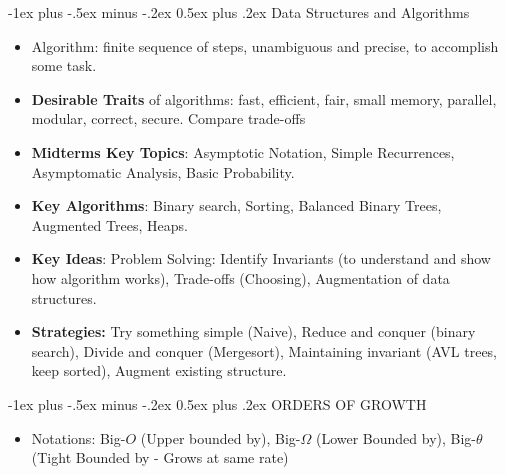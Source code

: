 \documentclass[10pt, landscape]{article}
\makeatletter
\renewcommand{\section}{\@startsection{section}{1}{0mm}%
                                {-1ex plus -.5ex minus -.2ex}%
                                {0.5ex plus .2ex}%
                                {\normalfont\large\bfseries}}
\makeatother
\begin{document}
\raggedright
\footnotesize
\begin{multicols}{4}



\setlength{\columnseprule}{0.25pt}
\setlength{\premulticols}{1pt}
\setlength{\postmulticols}{1pt}
\setlength{\multicolsep}{1pt}
\setlength{\columnsep}{2pt}




 \begin{center}
  \end{center}
  
\section{Data Structures and Algorithms}
 \begin{itemize}
	\item Algorithm: finite sequence of steps, unambiguous and precise, to accomplish some task.
	\item \textbf{Desirable Traits} of algorithms: fast, efficient, fair, small memory, parallel, modular, correct, secure. Compare trade-offs
	\item \textbf{Midterms Key Topics}: Asymptotic Notation, Simple Recurrences, Asymptomatic Analysis, Basic Probability. 
	\item \textbf{Key Algorithms}: Binary search, Sorting, Balanced Binary Trees, Augmented Trees, Heaps. 
	\item \textbf{Key Ideas}: Problem Solving: Identify Invariants (to understand and show how algorithm works), Trade-offs (Choosing), Augmentation of data structures. 
	\item \textbf{Strategies:} Try something simple (Naive), Reduce and conquer (binary search), Divide and conquer (Mergesort), Maintaining invariant (AVL trees, keep sorted), Augment existing structure.
\end{itemize}


\section{ORDERS OF GROWTH}
\begin{itemize}
	\item Notations: Big-$O$ (Upper bounded by), Big-$\Omega$ (Lower Bounded by), Big-$\theta$ (Tight Bounded by - Grows at same rate)
\end{itemize}


\end{multicols}
\end{document}
